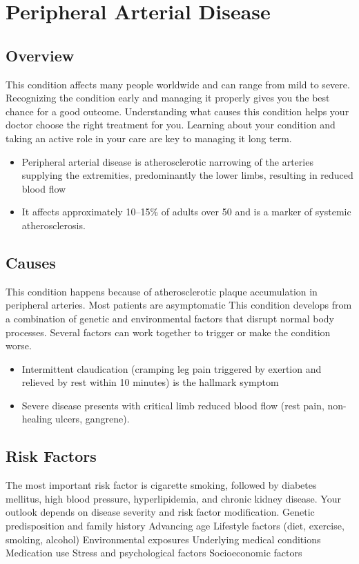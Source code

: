 \chapter{Peripheral Arterial Disease}
\label{sec:Peripheral Arterial Disease}

\section{Overview}
This condition affects many people worldwide and can range from mild to severe. Recognizing the condition early and managing it properly gives you the best chance for a good outcome. Understanding what causes this condition helps your doctor choose the right treatment for you. Learning about your condition and taking an active role in your care are key to managing it long term.

\begin{itemize}[noitemsep]
  \item Peripheral arterial disease is atherosclerotic narrowing of the arteries supplying the extremities, predominantly the lower limbs, resulting in reduced blood flow
  \item It affects approximately 10--15\% of adults over 50 and is a marker of systemic atherosclerosis.
\end{itemize}

\section{Causes}
This condition happens because of atherosclerotic plaque accumulation in peripheral arteries. Most patients are asymptomatic This condition develops from a combination of genetic and environmental factors that disrupt normal body processes. Several factors can work together to trigger or make the condition worse.

\begin{itemize}[noitemsep]
  \item Intermittent claudication (cramping leg pain triggered by exertion and relieved by rest within 10 minutes) is the hallmark symptom
  \item Severe disease presents with critical limb reduced blood flow (rest pain, non-healing ulcers, gangrene).
\end{itemize}

\section{Risk Factors}
The most important risk factor is cigarette smoking, followed by diabetes mellitus, high blood pressure, hyperlipidemia, and chronic kidney disease. Your outlook depends on disease severity and risk factor modification. Genetic predisposition and family history Advancing age Lifestyle factors (diet, exercise, smoking, alcohol) Environmental exposures Underlying medical conditions Medication use Stress and psychological factors Socioeconomic factors

